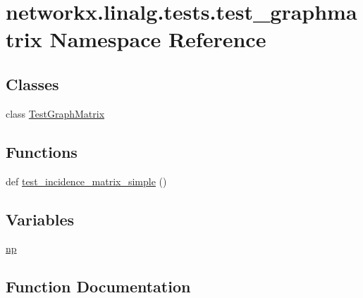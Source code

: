 \hypertarget{namespacenetworkx_1_1linalg_1_1tests_1_1test__graphmatrix}{}\section{networkx.\+linalg.\+tests.\+test\+\_\+graphmatrix Namespace Reference}
\label{namespacenetworkx_1_1linalg_1_1tests_1_1test__graphmatrix}
\subsection*{Classes}
\begin{DoxyCompactItemize}
\item 
class \hyperlink{classnetworkx_1_1linalg_1_1tests_1_1test__graphmatrix_1_1TestGraphMatrix}{Test\+Graph\+Matrix}
\end{DoxyCompactItemize}
\subsection*{Functions}
\begin{DoxyCompactItemize}
\item 
def \hyperlink{namespacenetworkx_1_1linalg_1_1tests_1_1test__graphmatrix_aa932c1ab2eab1b6e4be15e3a8362abec}{test\+\_\+incidence\+\_\+matrix\+\_\+simple} ()
\end{DoxyCompactItemize}
\subsection*{Variables}
\begin{DoxyCompactItemize}
\item 
\hyperlink{namespacenetworkx_1_1linalg_1_1tests_1_1test__graphmatrix_af4e6ae46db2eb5e71b36874b48e8a7ce}{np}
\end{DoxyCompactItemize}


\subsection{Function Documentation}
\mbox{\label{namespacenetworkx_1_1linalg_1_1tests_1_1test__graphmatrix_aa932c1ab2eab1b6e4be15e3a8362abec}} 
